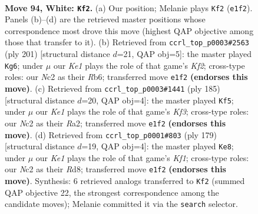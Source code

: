 \documentclass[11pt]{article}
\begin{document}
\clearpage

\begin{figure}[p]\centering
\begin{subfigure}{0.46\textwidth}\centering
\resizebox{\linewidth}{!}{%
\newchessgame
\chessboard[
  setfen={8/3r1kp1/5p2/7p/7P/6P1/1RN5/4K3 w - - 12 94},
  showmover=false,
  pgfstyle=straightmove, color=movearrow, markmove={e1-f2}
]}
\caption{}
\end{subfigure}\hfill
\begin{subfigure}{0.46\textwidth}\centering
\resizebox{\linewidth}{!}{%
\newchessgame
\chessboard[
  setfen={8/5k2/1r5p/7p/5P1P/2R2KP1/8/8 b - - 71 101},
  showmover=false,
  pgfstyle=straightmove, color=movearrow, markmove={f7-g6}
]}
\caption{}
\end{subfigure}
\\[4pt]
\begin{subfigure}{0.46\textwidth}\centering
\resizebox{\linewidth}{!}{%
\newchessgame
\chessboard[
  setfen={8/8/5kp1/7p/7P/3RKPP1/r7/8 b - - 34 93},
  showmover=false,
  pgfstyle=straightmove, color=movearrow, markmove={f6-f5}
]}
\caption{}
\end{subfigure}\hfill
\begin{subfigure}{0.46\textwidth}\centering
\resizebox{\linewidth}{!}{%
\newchessgame
\chessboard[
  setfen={3r1k2/5p2/5P1p/4P2P/R3K3/8/8/8 b - - 67 90},
  showmover=false,
  pgfstyle=straightmove, color=movearrow, markmove={f8-e8}
]}
\caption{}
\end{subfigure}
\caption{\textbf{Move 94, White: \texttt{Kf2}.} (a) Our position; Melanie plays \texttt{Kf2} (\texttt{e1f2}). Panels (b)--(d) are the retrieved master positions whose correspondence most drove this move (highest QAP objective among those that transfer to it). (b) Retrieved from \texttt{ccrl\_top\_p0003\#2563} (ply 201) [structural distance $d$=21, QAP obj=5]: the master played \texttt{Kg6}; under $\mu$ our \emph{Ke1} plays the role of that game's \emph{Kf2}; cross-type roles: our \emph{N}c2 as their \emph{R}b6; transferred move \texttt{e1f2} \textbf{(endorses this move)}. (c) Retrieved from \texttt{ccrl\_top\_p0003\#1441} (ply 185) [structural distance $d$=20, QAP obj=4]: the master played \texttt{Kf5}; under $\mu$ our \emph{Ke1} plays the role of that game's \emph{Kf3}; cross-type roles: our \emph{N}c2 as their \emph{R}a2; transferred move \texttt{e1f2} \textbf{(endorses this move)}. (d) Retrieved from \texttt{ccrl\_top\_p0001\#803} (ply 179) [structural distance $d$=19, QAP obj=4]: the master played \texttt{Ke8}; under $\mu$ our \emph{Ke1} plays the role of that game's \emph{Kf1}; cross-type roles: our \emph{N}c2 as their \emph{R}d8; transferred move \texttt{e1f2} \textbf{(endorses this move)}. Synthesis: 6 retrieved analogs transferred to \texttt{Kf2} (summed QAP objective 22, the strongest correspondence among the candidate moves); Melanie committed it via the \texttt{search} selector.}
\label{fig:thought-m186}
\end{figure}
\end{document}

